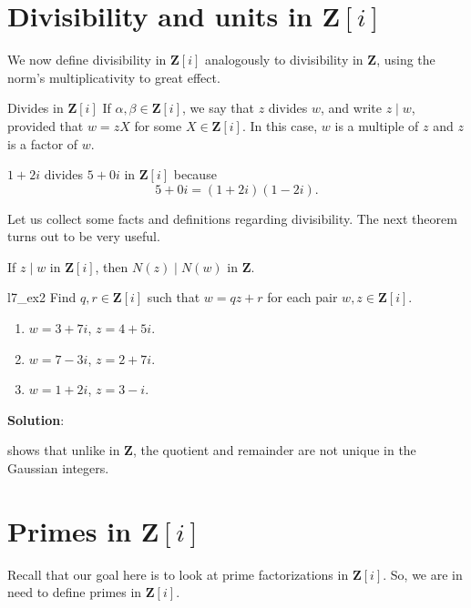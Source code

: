 \section{Divisibility and units in \texorpdfstring{$ \mathbf{Z}[i] $}{Z[i]}}
We now define divisibility in $ \mathbf{Z}[i] $ analogously to divisibility in $ \mathbf{Z} $, using
the norm's multiplicativity to great effect.
\begin{Definition}{Divides in $ \mathbf{Z}[i] $}{}
    If $ \alpha,\beta\in\mathbf{Z}[i] $, we say that $ z $ divides $ w $, and write $ z\mid w $,
    provided that $ w=zX $ for some $ X\in\mathbf{Z}[i] $. In this case, $ w $ is a multiple of $ z $
    and $ z $ is a factor of $ w $.
\end{Definition}
\begin{Example}{}{}
    $ 1+2i $ divides $ 5+0i $ in $ \mathbf{Z}[i] $ because
    \[ 5+0i=(1+2i)(1-2i). \]
\end{Example}
Let us collect some facts and definitions regarding divisibility. The next theorem turns out to be very useful.
\begin{Theorem}{}{}
    If $ z\mid w $ in $ \mathbf{Z}[i] $, then $ N(z)\mid N(w) $ in $ \mathbf{Z} $.
\end{Theorem}
\begin{Exercise}{}{l7_ex2}
    Find $ q,r\in\mathbf{Z}[i] $ such that $ w=qz+r $ for each pair $ w,z\in\mathbf{Z}[i] $.
    \begin{enumerate}[(1)]
        \item $ w=3+7i $, $ z=4+5i $.
        \item $ w=7-3i $, $ z=2+7i $.
        \item $ w=1+2i $, $ z=3-i $.
    \end{enumerate}
    \tcblower{}
    \textbf{Solution}:
\end{Exercise}
 shows that unlike in $ \mathbf{Z} $, the quotient and remainder are not unique
in the Gaussian integers.

\section{Primes in \texorpdfstring{$ \mathbf{Z}[i] $}{Z[i]}}
Recall that our goal here is to look at prime factorizations in $ \mathbf{Z}[i] $. So,
we are in need to define primes in $ \mathbf{Z}[i] $.

